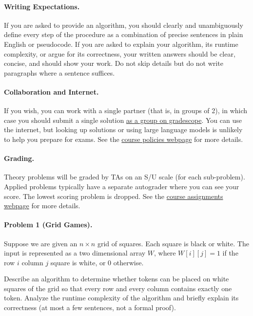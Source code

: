 \documentclass[11pt]{article}
\begin{document}
\paragraph{Writing Expectations.} If you are asked to provide an algorithm, you should clearly and unambiguously define every step of the procedure as a combination of precise sentences in plain English or pseudocode. If you are asked to explain your algorithm, its runtime complexity, or argue for its correctness, your written answers should be clear, concise, and should show your work. Do not skip details but do not write paragraphs where a sentence suffices.

\paragraph{Collaboration and Internet.} If you wish, you can work with a single partner (that is, in groups of 2), in which case you should submit a single solution \href{https://help.gradescope.com/article/m5qz2xsnjy-student-add-group-members}{as a group on gradescope}. You can use the internet, but looking up solutions or using large language models is unlikely to help you prepare for exams. See the \href{https://sites.duke.edu/spring24compsci330/policies/}{course policies webpage} for more details.

\paragraph{Grading.} Theory problems will be graded by TAs on an S/U scale (for each sub-problem). Applied problems typically have a separate autograder where you can see your score. The lowest scoring problem is dropped. See the \href{https://sites.duke.edu/spring24compsci330/assignments/}{course assignments webpage} for more details.



\newpage
\paragraph{Problem 1 (Grid Games).} Suppose we are given an $n\times n$ grid of squares. Each square is black or white. The input is represented as a two dimensional array $W$, where $W[i][j] = 1$ if the row $i$ column $j$ square is white, or 0 otherwise.

Describe an algorithm to determine whether tokens can be placed on white squares of the grid so that every row and every column contains exactly one token. Analyze the runtime complexity of the algorithm and briefly explain its correctness (at most a few sentences, not a formal proof).
\end{document}
